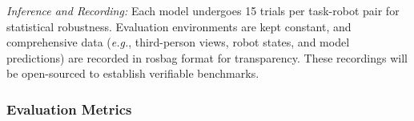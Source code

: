 \textit{Inference and Recording:} 
Each model undergoes 15 trials per task-robot pair for statistical robustness. Evaluation environments are kept constant, and comprehensive data (\textit{e.g.}, third-person views, robot states, and model predictions) are recorded in rosbag format for transparency. These recordings will be open-sourced to establish verifiable benchmarks.

\subsubsection{Evaluation Metrics}

